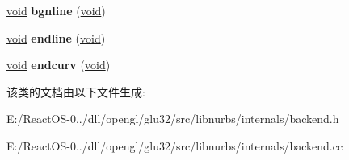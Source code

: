 \begin{DoxyCompactItemize}
\item 
\mbox{\label{class_backend_ac5278b27f3d01dc423192b52bd207141}} 
\hyperlink{interfacevoid}{void} {\bfseries bgnline} (\hyperlink{interfacevoid}{void})
\item 
\mbox{\label{class_backend_ab4762e215cac61d43742c9ce47702957}} 
\hyperlink{interfacevoid}{void} {\bfseries endline} (\hyperlink{interfacevoid}{void})
\item 
\mbox{\label{class_backend_a0ce2c6b7ae457603063e19b78f2fbc21}} 
\hyperlink{interfacevoid}{void} {\bfseries endcurv} (\hyperlink{interfacevoid}{void})
\end{DoxyCompactItemize}


该类的文档由以下文件生成\+:\begin{DoxyCompactItemize}
\item 
E\+:/\+React\+O\+S-\/0../dll/opengl/glu32/src/libnurbs/internals/backend.\+h\item 
E\+:/\+React\+O\+S-\/0../dll/opengl/glu32/src/libnurbs/internals/backend.\+cc\end{DoxyCompactItemize}
